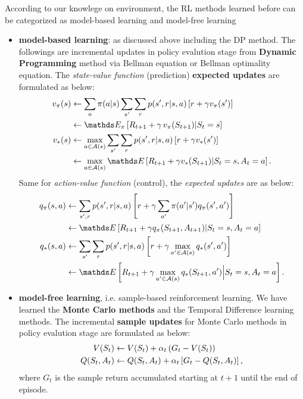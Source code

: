 \documentclass[11pt]{article}
\begin{document}
According to our knowlege on environment, the RL methods learned before can be categorized as model-based learning and model-free learning
\begin{itemize}
\item \textbf{model-based learning}: as discussed above including the DP method. The followings are incremental updates in policy evalution stage from \textbf{Dynamic Programming} method via Bellman equation or Bellman optimality  equation. The \emph{state-value function} (prediction) \textbf{expected updates} are formulated as below: 
\begin{align*}
v_{\pi}(s) &\leftarrow \sum_{a}\pi(a|s)\sum_{s'}\sum_{r}p(s', r| s, a)\brac{r + \gamma v_{\pi}(s')} \\
&\leftarrow \E{\pi}{R_{t+1}  + \gamma\,v_{\pi}(S_{t+1}) | S_{t} = s} \\
v_{*}(s) &\leftarrow  \max_{a\in \cA(s)}\sum_{s'}\sum_{r}p(s', r|s, a)\brac{r + \gamma v_{*}(s')} \\
&\leftarrow  \max_{a\in \cA(s)}\E{}{R_{t+1} + \gamma v_{*}(S_{t+1}) | S_{t}=s, A_{t}=a}.
\end{align*} Same for  \emph{action-value function} (control), the \emph{expected updates} are as below: 
\begin{align*}
q_{\pi}(s, a) &\leftarrow\sum_{s', r}p(s', r|s,a)\brac{r+ \gamma \sum_{a'}\pi(a'|s')q_{\pi}(s', a')} \\
&\leftarrow \E{}{R_{t+1} + \gamma q_{\pi}(S_{t+1}, A_{t+1}) | S_{t}=s, A_{t}=a}\\
q_{*}(s, a) &\leftarrow  \sum_{s'}\sum_{r}p(s', r|s, a)\brac{r + \gamma  \max_{a'\in \cA(s)}q_{*}(s', a')} \\
&\leftarrow \E{}{R_{t+1} + \gamma \max_{a'\in \cA(s)}q_{*}(S_{t+1}, a') \Big| S_{t}=s, A_{t}=a}.
\end{align*}

\item \textbf{model-free learning}, i.e. sample-based reinforcement learning. We have learned the \textbf{Monte Carlo methods} and the Temporal Difference learning methods.  The incremental \textbf{sample updates} for  Monte Carlo methods in policy evalution stage are formulated as below: 
\begin{align*}
V(S_{t}) &\leftarrow V(S_{t}) + \alpha_{t}\left(G_{t} - V(S_{t})\right) \\
Q(S_{t}, A_{t}) &\leftarrow Q(S_{t}, A_{t}) + \alpha_{t}\left[G_{t}  - Q(S_{t}, A_{t})\right],
\end{align*} where $G_{t}$ is the sample return accumulated starting at $t+1$ until the end of episode.


\end{itemize}
\end{document}
